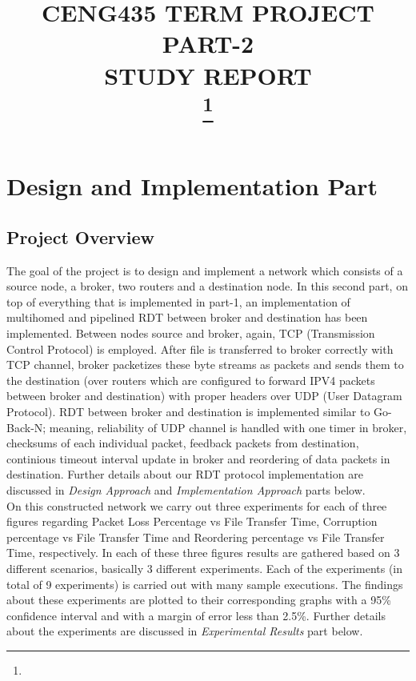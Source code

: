 \documentclass[conference]{IEEEtran}
\begin{document}
\title{CENG435 TERM PROJECT PART-2 \\ STUDY REPORT \\
{\footnotesize}
\thanks{}
}

\author{
\and
{}
}

\maketitle

\section{Design and Implementation Part}
\subsection{Project Overview}
The goal of the project is to design and implement a network which consists of a source node, a broker, two routers and a destination node. In this second part, on top of everything that is implemented in part-1, an implementation of multihomed and pipelined RDT between broker and destination has been implemented. Between nodes source and broker, again, TCP (Transmission Control Protocol) is employed. After file is transferred to broker correctly with TCP channel, broker packetizes these byte streams as packets and sends them to the destination (over routers which are configured to forward IPV4 packets between broker and destination) with proper headers over UDP (User Datagram Protocol). RDT between broker and destination is implemented similar to Go-Back-N; meaning, reliability of UDP channel is handled with one timer in broker, checksums of each individual packet, feedback packets from destination, continious timeout interval update in broker and reordering of data packets in destination. Further details about our RDT protocol implementation are discussed in \textit{Design Approach} and \textit{Implementation Approach} parts below. \\

On this constructed network we carry out three experiments for each of three figures regarding Packet Loss Percentage vs File Transfer Time, Corruption percentage vs File Transfer Time and Reordering percentage vs File Transfer Time, respectively. In each of these three figures results are gathered based on 3 different scenarios, basically 3 different experiments. Each of the experiments (in total of 9 experiments) is carried out with many sample executions. The findings about these experiments are plotted to their corresponding graphs with a 95\% confidence interval and with a margin of error less than 2.5\%. Further details about the experiments are discussed in \textit{Experimental Results} part below. \\
\end{document}
